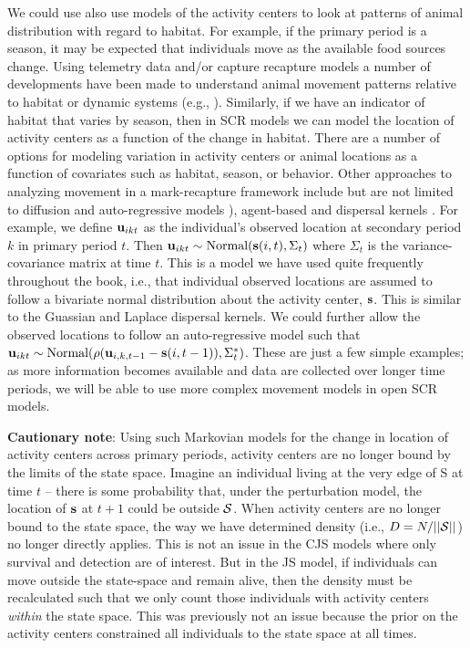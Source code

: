 We could use also use models of the activity centers to look at
patterns of animal distribution with regard to habitat.  For example,
if the primary period is a season, it may be expected that individuals
move as the available food sources change. Using telemetry data and/or
capture recapture models a number of developments have been made to
understand animal movement patterns relative to habitat or dynamic
systems (e.g., \cite{jonsen_etal:2005, hooten_wikle:2010}).
Similarly, if we have an indicator of habitat that varies by season,
then in SCR models we can model the location of activity centers as a
function of the change in habitat.  There are a number of options for
modeling variation in activity centers or animal locations as a
function of covariates such as habitat, season, or behavior.  Other
approaches to analyzing movement in a mark-recapture framework include
but are not limited to diffusion and auto-regressive models
\citep{ovaskainen:2004, ovaskainen_etal:2008}), agent-based
\citep{grimm_etal:2005, hooten_etal:2010} and dispersal kernels
\citep{fujiwara_etal:2006}.  For example, we define ${\bf u}_{ikt}$ as
the individual's observed location at secondary period $k$ in primary
period $t$.  Then ${\bf u}_{ikt} \sim \mbox{Normal}({\bf s}(i,t),
\Sigma_t)$ where $\Sigma_t$ is the variance-covariance matrix at time
$t$.  This is a model we have used quite frequently throughout the
book, i.e., that individual observed locations are assumed to follow a
bivariate normal distribution about the activity center, ${\bf s}$.
This is similar to
the Guassian and Laplace dispersal kernels.  We could further allow the
observed locations to follow an auto-regressive model such that ${\bf
  u}_{ikt} \sim \mbox{Normal}(\rho ({\bf u}_{i,k,t-1} - {\bf
  s}(i,t-1)), \Sigma^{*}_t)$.  These are just a few simple examples; as
more information becomes available and data are collected over longer
time periods, we will be able to use more complex movement models in open SCR models.



{\flushleft \bf Cautionary note}: 
Using such Markovian models for the
change in location of activity centers across primary periods,
activity centers are no longer bound by the limits of the state space.
Imagine an individual living at the very edge of S at time $t$ --
there is some probability that, under the perturbation model, the
location of ${\bf s}$ at $t+1$ could be outside ${\cal S}$.  When
activity centers are no longer bound to the state space, the way we
have determined density (i.e., $D = N/||{\cal S}||$) no longer
directly applies.  This is not an issue in the CJS models where only
survival and detection are of interest.  But in the JS model, if
individuals can move outside the state-space and remain alive, then
the density must be recalculated such that we only count those
individuals with activity centers {\it within} the state space.  This
was previously not an issue because the prior on the activity centers
constrained all individuals to the state space at all times.

